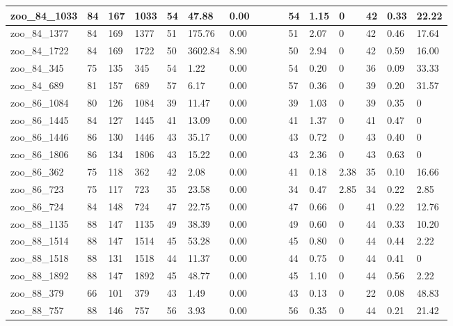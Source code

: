 \begin{landscape}
\begin{longtable}{llllllllllllllll}
zoo\_84\_1033 & 84 & 167 & 1033 & 54 & 47.88 & 0.00 &  &  &  & 54 & 1.15 & 0 & 42 & 0.33 & 22.22 \\ \hline 
zoo\_84\_1377 & 84 & 169 & 1377 & 51 & 175.76 & 0.00 &  &  &  & 51 & 2.07 & 0 & 42 & 0.46 & 17.64 \\ \hline 
zoo\_84\_1722 & 84 & 169 & 1722 & 50 & 3602.84 & 8.90 &  &  &  & 50 & 2.94 & 0 & 42 & 0.59 & 16.00 \\ \hline 
zoo\_84\_345 & 75 & 135 & 345 & 54 & 1.22 & 0.00 &  &  &  & 54 & 0.20 & 0 & 36 & 0.09 & 33.33 \\ \hline 
zoo\_84\_689 & 81 & 157 & 689 & 57 & 6.17 & 0.00 &  &  &  & 57 & 0.36 & 0 & 39 & 0.20 & 31.57 \\ \hline 
zoo\_86\_1084 & 80 & 126 & 1084 & 39 & 11.47 & 0.00 &  &  &  & 39 & 1.03 & 0 & 39 & 0.35 & 0 \\ \hline 
zoo\_86\_1445 & 84 & 127 & 1445 & 41 & 13.09 & 0.00 &  &  &  & 41 & 1.37 & 0 & 41 & 0.47 & 0 \\ \hline 
zoo\_86\_1446 & 86 & 130 & 1446 & 43 & 35.17 & 0.00 &  &  &  & 43 & 0.72 & 0 & 43 & 0.40 & 0 \\ \hline 
zoo\_86\_1806 & 86 & 134 & 1806 & 43 & 15.22 & 0.00 &  &  &  & 43 & 2.36 & 0 & 43 & 0.63 & 0 \\ \hline 
zoo\_86\_362 & 75 & 118 & 362 & 42 & 2.08 & 0.00 &  &  &  & 41 & 0.18 & 2.38 & 35 & 0.10 & 16.66 \\ \hline 
zoo\_86\_723 & 75 & 117 & 723 & 35 & 23.58 & 0.00 &  &  &  & 34 & 0.47 & 2.85 & 34 & 0.22 & 2.85 \\ \hline 
zoo\_86\_724 & 84 & 148 & 724 & 47 & 22.75 & 0.00 &  &  &  & 47 & 0.66 & 0 & 41 & 0.22 & 12.76 \\ \hline 
zoo\_88\_1135 & 88 & 147 & 1135 & 49 & 38.39 & 0.00 &  &  &  & 49 & 0.60 & 0 & 44 & 0.33 & 10.20 \\ \hline 
zoo\_88\_1514 & 88 & 147 & 1514 & 45 & 53.28 & 0.00 &  &  &  & 45 & 0.80 & 0 & 44 & 0.44 & 2.22 \\ \hline 
zoo\_88\_1518 & 88 & 131 & 1518 & 44 & 11.37 & 0.00 &  &  &  & 44 & 0.75 & 0 & 44 & 0.41 & 0 \\ \hline 
zoo\_88\_1892 & 88 & 147 & 1892 & 45 & 48.77 & 0.00 &  &  &  & 45 & 1.10 & 0 & 44 & 0.56 & 2.22 \\ \hline 
zoo\_88\_379 & 66 & 101 & 379 & 43 & 1.49 & 0.00 &  &  &  & 43 & 0.13 & 0 & 22 & 0.08 & 48.83 \\ \hline 
zoo\_88\_757 & 88 & 146 & 757 & 56 & 3.93 & 0.00 &  &  &  & 56 & 0.35 & 0 & 44 & 0.21 & 21.42 \\ \hline 

\end{longtable}
\end{landscape}
